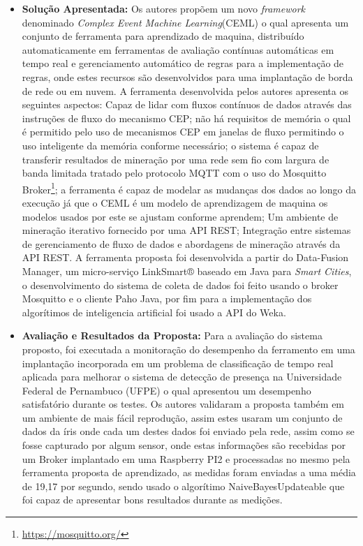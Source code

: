 \documentclass[tid,table]{texufpel} %
\begin{document}
\begin{itemize}
	\item \textbf{Solução Apresentada:} Os autores propõem um novo \textit{framework} denominado \textit{Complex Event Machine Learning}(CEML) o qual apresenta um conjunto de ferramenta para aprendizado de maquina, distribuído automaticamente em ferramentas de avaliação contínuas automáticas em tempo real e gerenciamento automático de regras para a implementação de regras, onde estes recursos são desenvolvidos para uma implantação de borda de rede ou em nuvem. A ferramenta desenvolvida pelos autores apresenta os seguintes aspectos: Capaz de lidar com fluxos contínuos de dados através das instruções de fluxo do mecanismo CEP; não há requisitos de memória o qual é permitido pelo uso de mecanismos CEP em janelas de fluxo permitindo o uso inteligente da memória conforme necessário; o sistema é capaz de transferir resultados de mineração por uma rede sem fio com largura de banda limitada tratado pelo protocolo MQTT com o uso do Mosquitto Broker\footnote{\url{https://mosquitto.org/}}; a ferramenta é capaz de modelar as mudanças dos dados ao longo da execução já que o CEML é um modelo de aprendizagem de maquina os modelos usados por este se ajustam conforme aprendem; Um ambiente de mineração iterativo fornecido por uma API REST; Integração entre sistemas de gerenciamento de fluxo de dados e abordagens de mineração através da API REST. A ferramenta proposta foi desenvolvida a partir do Data-Fusion Manager, um micro-serviço LinkSmart® baseado em Java para \textit{Smart Cities}, o desenvolvimento do sistema de coleta de dados foi feito usando o broker Mosquitto e o cliente Paho Java, por fim para a implementação dos algorítimos de inteligencia artificial foi usado a API do Weka. 
	
	\item \textbf{Avaliação e Resultados da Proposta:} Para a avaliação do sistema proposto, foi executada a monitoração do desempenho da ferramento em uma implantação incorporada em um problema de classificação de tempo real aplicada para melhorar o sistema de detecção de presença na Universidade Federal de Pernambuco (UFPE) o qual apresentou um desempenho satisfatório durante os testes. Os autores validaram a proposta também em um ambiente de mais fácil reprodução, assim estes usaram um conjunto de dados da íris onde cada um destes dados foi enviado pela rede, assim como se fosse capturado por algum sensor,  onde estas informações são recebidas por um Broker implantado em uma Raspberry PI2 e processadas no mesmo pela ferramenta proposta de aprendizado, as medidas foram enviadas a uma média de 19,17 por segundo, sendo usado o algorítimo NaiveBayesUpdateable que foi capaz de apresentar bons resultados durante as medições.
	
	
	
\end{itemize}
\end{document}
